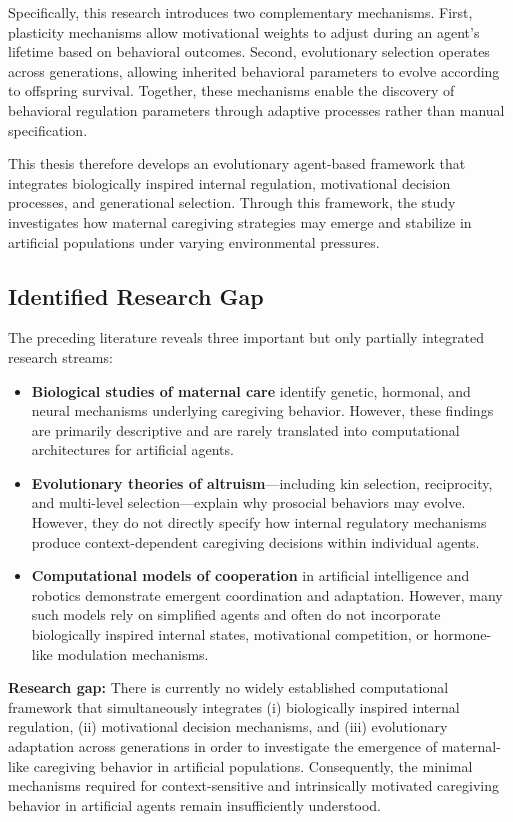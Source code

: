 Specifically, this research introduces two complementary mechanisms. First, plasticity mechanisms allow motivational weights to adjust during an agent's lifetime based on behavioral outcomes. Second, evolutionary selection operates across generations, allowing inherited behavioral parameters to evolve according to offspring survival. Together, these mechanisms enable the discovery of behavioral regulation parameters through adaptive processes rather than manual specification.

This thesis therefore develops an evolutionary agent-based framework that integrates biologically inspired internal regulation, motivational decision processes, and generational selection. Through this framework, the study investigates how maternal caregiving strategies may emerge and stabilize in artificial populations under varying environmental pressures.

\subsection{Identified Research Gap}

The preceding literature reveals three important but only partially integrated research streams:

\begin{itemize}
    \item \textbf{Biological studies of maternal care} identify genetic, hormonal, and neural mechanisms underlying caregiving behavior. However, these findings are primarily descriptive and are rarely translated into computational architectures for artificial agents.

    \item \textbf{Evolutionary theories of altruism}---including kin selection, reciprocity, and multi-level selection---explain why prosocial behaviors may evolve. However, they do not directly specify how internal regulatory mechanisms produce context-dependent caregiving decisions within individual agents.

    \item \textbf{Computational models of cooperation} in artificial intelligence and robotics demonstrate emergent coordination and adaptation. However, many such models rely on simplified agents and often do not incorporate biologically inspired internal states, motivational competition, or hormone-like modulation mechanisms.
\end{itemize}

\noindent
\textbf{Research gap:} There is currently no widely established computational framework that simultaneously integrates (i) biologically inspired internal regulation, (ii) motivational decision mechanisms, and (iii) evolutionary adaptation across generations in order to investigate the emergence of maternal-like caregiving behavior in artificial populations. Consequently, the minimal mechanisms required for context-sensitive and intrinsically motivated caregiving behavior in artificial agents remain insufficiently understood.


